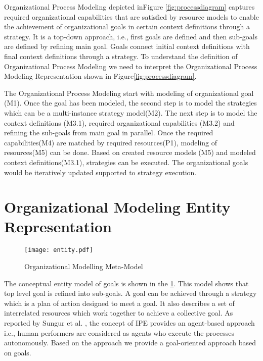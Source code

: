 \hspace{4ex} Organizational Process Modeling depicted inFigure \ref{fig:processdiagram} captures required organizational capabilities that are satisfied by resource models  to enable the achievement of organizational goals in certain context definitions through a strategy. It is a top-down approach, i.e., first goals are defined and then sub-goals  are defined by refining main goal. Goals connect initial context definitions with final context definitions through a strategy.  To understand the definition of Organizational Process Modeling we need to interpret the Organizational Process Modeling Representation shown in Figure\ref{fig:processdiagram}. 

\hspace{4ex} The Organizational Process Modeling start with modeling of organizational goal (M1). Once the goal has been modeled, the second step is to model the strategies which can be a multi-instance strategy model(M2). The next step is to model the context definitions (M3.1), required organizational capabilities (M3.2) and refining the sub-goals from main goal in parallel. Once the required capabilities(M4) are matched by required resources(P1), modeling of resources(M5) can be done.  Based on created resource models (M5) and modeled context definitions(M3.1), strategies can be executed. The organizational goals would be iteratively updated supported to strategy execution.  


\section{Organizational Modeling Entity Representation}

\begin{figure}
	\centering
	\texttt{[image: entity.pdf]}
	\caption{Organizational Modelling Meta-Model}
	\label{fig:metamodel}
\end{figure}

\hspace{4ex} The conceptual entity model of goals is shown in the \ref{fig:metamodel}. This model shows that top level goal is refined into sub-goals. A goal can be achieved through a strategy which is a plan of action designed to meet a goal. It also describes a set of interrelated resources which work together to achieve a collective goal. As reported by Sungur et al. \cite{Sungur2014a}, the concept of IPE provides an agent-based approach i.e., human performers are considered as agents who execute the processes autonomously. Based on the approach \cite{Sungur2014a} we provide a goal-oriented approach based on goals.

